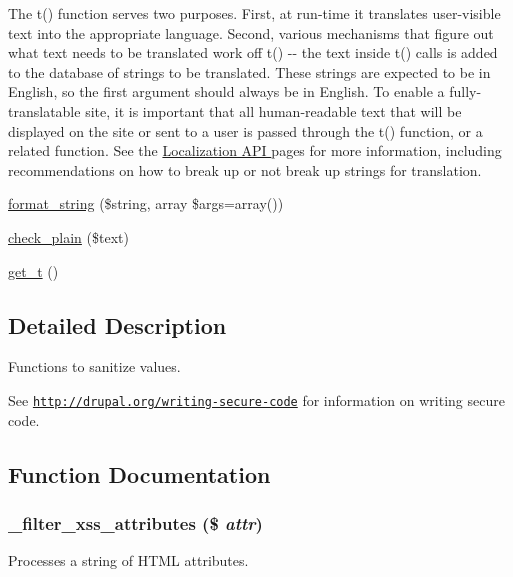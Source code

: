 The t() function serves two purposes. First, at run-\/time it translates user-\/visible text into the appropriate language. Second, various mechanisms that figure out what text needs to be translated work off t() -\/-\/ the text inside t() calls is added to the database of strings to be translated. These strings are expected to be in English, so the first argument should always be in English. To enable a fully-\/translatable site, it is important that all human-\/readable text that will be displayed on the site or sent to a user is passed through the t() function, or a related function. See the \hyperlink{}{Localization API } pages for more information, including recommendations on how to break up or not break up strings for translation.\begin{DoxyCompactItemize}
\item 
\hyperlink{group__sanitization_ga8da272cf93fb6ba229eca7c0b06ea4d2}{format\_\-string} (\$string, array \$args=array())
\item 
\hyperlink{group__sanitization_ga76fc67a30fd8d75ddd80565e6e65a13d}{check\_\-plain} (\$text)
\item 
\hyperlink{group__sanitization_gaa50232f577883a48731fc93530628a79}{get\_\-t} ()
\end{DoxyCompactItemize}


\subsection{Detailed Description}
Functions to sanitize values.

See \href{http://drupal.org/writing-secure-code}{\tt http://drupal.org/writing-\/secure-\/code} for information on writing secure code. 

\subsection{Function Documentation}
\hypertarget{group__sanitization_ga3c24df8bdf07aa972dd82aa2ab35858f}{
\subsubsection[{\_\-filter\_\-xss\_\-attributes}]{\setlength{\rightskip}{0pt plus 5cm}\_\-filter\_\-xss\_\-attributes (\$ {\em attr})}}
\label{group__sanitization_ga3c24df8bdf07aa972dd82aa2ab35858f}
Processes a string of HTML attributes.

